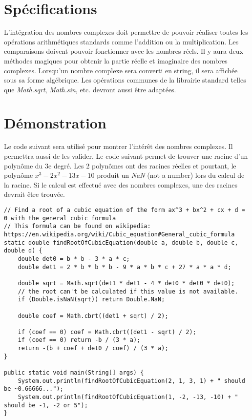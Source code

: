\section{Spécifications}

L'intégration des nombres complexes doit permettre de pouvoir réaliser toutes les opérations arithmétiques standards comme l'addition ou la multiplication. Les comparaisons doivent pouvoir fonctionner avec les nombres réels. Il y aura deux méthodes magiques pour obtenir la partie réelle et imaginaire des nombres complexes. Lorsqu'un nombre complexe sera converti en string, il sera affichée sous sa forme algébrique. Les opérations communes de la librairie standard telles que \textit{Math.sqrt}, \textit{Math.sin}, etc. devront aussi être adaptées.

\section{Démonstration}

Le code suivant sera utilisé pour montrer l'intérêt des nombres complexes. Il permettra aussi de les valider. Le code suivant permet de trouver une racine d'un polynôme du 3e degré. Les 2 polynômes ont des racines réelles et pourtant, le polynôme $x^3 - 2x^2 - 13x - 10$ produit un \textit{NaN} (not a number) lors du calcul de la racine. Si le calcul est effectué avec des nombres complexes, une des racines devrait être trouvée.
\begin{verbatim}
// Find a root of a cubic equation of the form ax^3 + bx^2 + cx + d = 0 with the general cubic formula
// This formula can be found on wikipedia: https://en.wikipedia.org/wiki/Cubic_equation#General_cubic_formula
static double findRootOfCubicEquation(double a, double b, double c, double d) {
    double det0 = b * b - 3 * a * c;
    double det1 = 2 * b * b * b - 9 * a * b * c + 27 * a * a * d;

    double sqrt = Math.sqrt(det1 * det1 - 4 * det0 * det0 * det0);
    // the root can't be calculated if this value is not available.
    if (Double.isNaN(sqrt)) return Double.NaN;

    double coef = Math.cbrt((det1 + sqrt) / 2);

    if (coef == 0) coef = Math.cbrt((det1 - sqrt) / 2);
    if (coef == 0) return -b / (3 * a);
    return -(b + coef + det0 / coef) / (3 * a);
}

public static void main(String[] args) {
    System.out.println(findRootOfCubicEquation(2, 1, 3, 1) + " should be ~0.66666...");
    System.out.println(findRootOfCubicEquation(1, -2, -13, -10) + " should be -1, -2 or 5");
}
\end{verbatim}